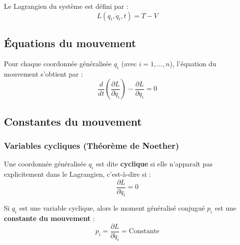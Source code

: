 \documentclass[french]{yLectureNote}
\begin{document}
\begin{definition}[Lagrangien]
Le Lagrangien du système est défini par :
$$L(q_i, \dot{q}_i, t) = T - V$$
\end{definition}
\subsection{Équations du mouvement}
\begin{theorem}
Pour chaque coordonnée généralisée $q_i$ (avec $i = 1, \dots, n$), l'équation du mouvement s'obtient par :
$$\frac{d}{dt}\left( \frac{\partial L}{\partial \dot{q}_i} \right) - \frac{\partial L}{\partial q_i} = 0$$
\end{theorem}

\subsection{Constantes du mouvement}
\subsubsection{Variables cycliques (Théorème de Noether)}

\begin{definition}
Une coordonnée généralisée $q_i$ est dite \textbf{cyclique} si elle n'apparaît pas explicitement dans le Lagrangien, c'est-à-dire si :
$$\frac{\partial L}{\partial q_i} = 0$$
\end{definition}

\begin{proposition}
Si $q_i$ est une variable cyclique, alors le moment généralisé conjugué $p_i$ est une \textbf{constante du mouvement} :
$$p_i = \frac{\partial L}{\partial \dot{q}_i} = \text{Constante}$$
\end{proposition}
\end{document}
